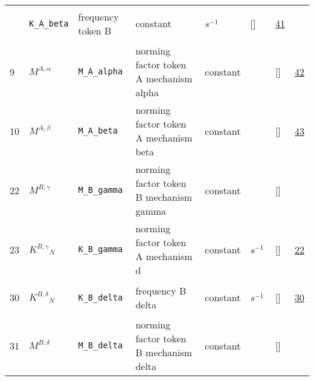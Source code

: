 \begin{longtable}{|p{1cm}|p{3cm}|p{3cm}|p{7cm}|p{3.0cm}|p{3cm}|p{2cm}|p{1cm}|}
             & \verb|K_A_beta|
             & frequency token B
             & \begin{lay}constant \end{lay}
             & $ s^{-1} \, $
             & []
             & \hyperlink{"e:41"}{ 41 }
                 \\
    9
             & \hypertarget{"v:9"}{ $ {{M^{A,\alpha}}}{_{}} $}
             & \verb|M_A_alpha|
             & norming factor token A mechanism alpha
             & \begin{lay}constant \end{lay}
             & $  $
             & []
             & \hyperlink{"e:42"}{ 42 }
                 \\
    10
             & \hypertarget{"v:10"}{ $ {{M^{A,\beta}}}{_{}} $}
             & \verb|M_A_beta|
             & norming factor token A mechanism beta
             & \begin{lay}constant \end{lay}
             & $  $
             & []
             & \hyperlink{"e:43"}{ 43 }
                 \\
    22
             & \hypertarget{"v:22"}{ $ {{M^{B,\gamma}}}{_{}} $}
             & \verb|M_B_gamma|
             & norming factor token B mechanism gamma
             & \begin{lay}constant \end{lay}
             & $  $
             & []
             & \\
    23
             & \hypertarget{"v:23"}{ $ {{K^{B,\gamma}}}{_{N}} $}
             & \verb|K_B_gamma|
             & norming factor token A mechanism d
             & \begin{lay}constant \end{lay}
             & $ s^{-1} \, $
             & []
             & \hyperlink{"e:22"}{ 22 }
                 \\
    30
             & \hypertarget{"v:30"}{ $ {{K^{B,\delta}}}{_{N}} $}
             & \verb|K_B_delta|
             & frequency B delta
             & \begin{lay}constant \end{lay}
             & $ s^{-1} \, $
             & []
             & \hyperlink{"e:30"}{ 30 }
                 \\
    31
             & \hypertarget{"v:31"}{ $ {{M^{B,\delta}}}{_{}} $}
             & \verb|M_B_delta|
             & norming factor token B mechanism delta
             & \begin{lay}constant \end{lay}
             & $  $
             & []
             & \\
    \end{longtable}